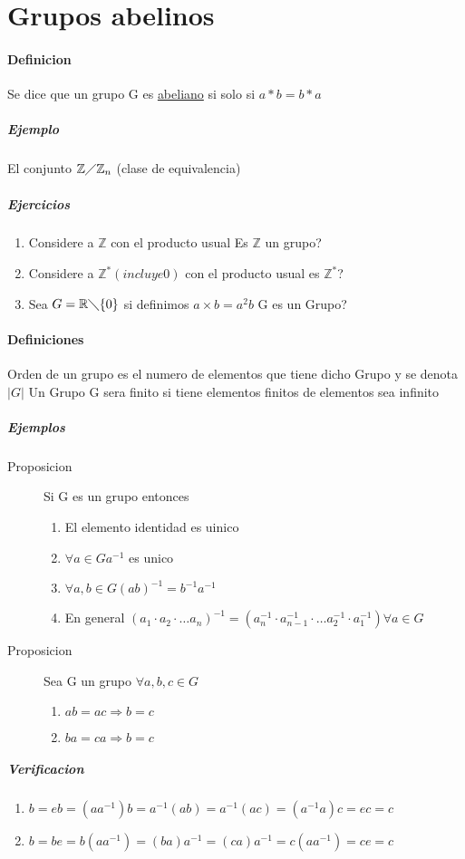 \newpage
\section{Grupos abelinos}
  \paragraph{Definicion}
  Se dice que un grupo G es \underline{abeliano} si solo si $a*b=b*a$ 
  \subparagraph{Ejemplo}
  El conjunto $\mathbb{Z} \diagup \mathbb{Z} _{n}$ (clase de equivalencia)
 \subparagraph{Ejercicios}
 \begin{enumerate}
   \item Considere a $\mathbb{Z}$ con el producto usual Es $\mathbb{Z}$ un grupo?
   \item Considere a $\mathbb{Z}^{*}(incluye 0)$ con el producto usual es $\mathbb{Z} ^{*}$?
   \item Sea $G=\mathbb{R} \diagdown \{ 0\} $ si definimos $a\times b=a^{2}b$ G es un Grupo?
    \end{enumerate}
 \paragraph{Definiciones}
   Orden de un grupo es el numero de elementos que tiene dicho Grupo y se denota $|G| $ 
  Un Grupo G sera finito si tiene elementos finitos de elementos sea infinito
  \subparagraph{Ejemplos}
\begin{description} 
  \item[Proposicion] Si G es un grupo entonces
  \begin{enumerate}
    \item El elemento identidad es uinico
    \item $\forall a\in G a^{-1}$ es unico
    \item $\forall a,b \in G(ab)^{-1}=b^{-1}a^{-1}$
    \item En general $(a_{1}\cdot a_{2}\cdot  \dots a_{n}) ^{-1} = (a_{n}^{-1}\cdot a_{n-1}^{-1}\cdot \dots a_{2}^{-1}\cdot a_{1}^{-1} ) \forall  a\in G $ 
  \end{enumerate}
  \item[Proposicion] Sea G un grupo $\forall a,b,c\in G$
  \begin{enumerate}
    \item $ab=ac \Rightarrow b=c$
    \item $ba=ca \Rightarrow b=c$
  \end{enumerate}
\end{description}
\subparagraph{Verificacion}
\begin{enumerate}
  \item $b=eb=(aa^{-1})b=a^{-1}(ab)=a^{-1}(ac)=(a^{-1}a)c=ec=c$
  \item $b=be=b(aa^{-1})=(ba)a^{-1}=(ca)a^{-1}=c(aa^{-1})=ce=c$
\end{enumerate}
